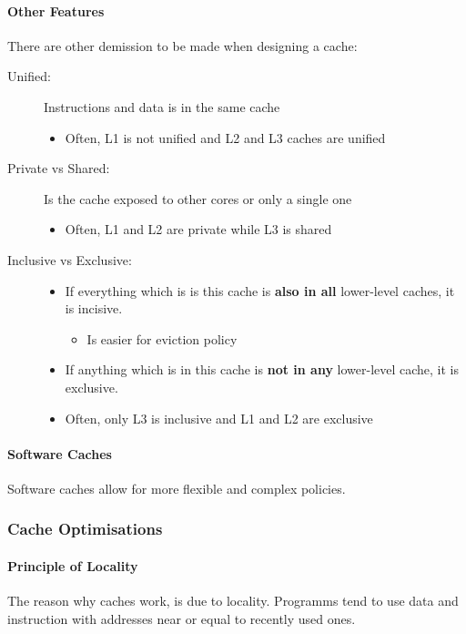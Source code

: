 \paragraph{Other Features}
There are other demission to be made when designing a cache:

\begin{description}
    \item[Unified:] Instructions and data is in the same cache
        \begin{itemize}
            \item Often, L1 is not unified and L2 and L3 caches are unified
        \end{itemize}
    \item[Private vs Shared:] Is the cache exposed to other cores or only a single one
        \begin{itemize}
            \item Often, L1 and L2 are private while L3 is shared
        \end{itemize}
    \item[Inclusive vs Exclusive:] 
        \begin{itemize}
            \item If everything which is is this cache is \textbf{also in all} lower-level caches, it is incisive.
                \begin{itemize}
                    \item Is easier for eviction policy
                \end{itemize}
            \item If anything which is in this cache is \textbf{not in any} lower-level cache, it is exclusive.
            \item Often, only L3 is inclusive and L1 and L2 are exclusive
        \end{itemize}
\end{description}

\paragraph{Software Caches}
Software caches allow for more flexible and complex policies.

\subsubsection{Cache Optimisations}

\paragraph{Principle of Locality}
The reason why caches work, is due to locality. Programms tend to use data and instruction with addresses near or equal to recently used ones.

